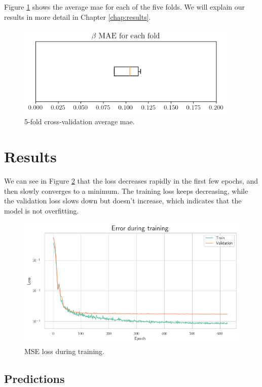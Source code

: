 Figure \ref{fig:cross-validation} shows the average \gls{mae} for each of the
five folds. We will explain our results in more detail in Chapter
\ref{chap:results}.

\begin{figure}[H]
	\centering
	\includegraphics[width=300pt]{files/average_mae.png}
	\caption{5-fold cross-validation average \gls{mae}.}
	\label{fig:cross-validation}
\end{figure}

\section{Results}

We can see in Figure \ref{fig:loss} that the loss decreases rapidly in the
first few epochs, and then slowly converges to a minimum. The training loss
keeps decreasing, while the validation loss slows down but doesn't increase,
which indicates that the model is not overfitting.

\begin{figure}[H]
	\centering
	\includegraphics[width=\textwidth]{files/loss}
	\caption{MSE loss during training.}
	\label{fig:loss}
\end{figure}

\subsection{Predictions}

